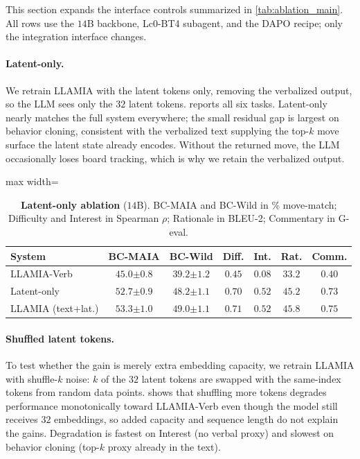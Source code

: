 This section expands the interface controls summarized in \cref{tab:ablation_main}. All rows use the $14$B backbone, Lc0-BT4 subagent, and the DAPO recipe; only the integration interface changes.

\paragraph{Latent-only.} We retrain LLAMIA with the latent tokens only, removing the verbalized output, so the LLM sees only the $32$ latent tokens.  reports all six tasks. Latent-only nearly matches the full system everywhere; the small residual gap is largest on behavior cloning, consistent with the verbalized text supplying the top-$k$ move surface the latent state already encodes. Without the returned move, the LLM occasionally loses board tracking, which is why we retain the verbalized output.

\begin{table}[h]
\centering
\caption{\textbf{Latent-only ablation} ($14$B). BC-MAIA and BC-Wild in \% move-match; Difficulty and Interest in Spearman $\rho$; Rationale in BLEU-2; Commentary in G-eval.}
\label{tab:abl_latent_only}
\begin{adjustbox}{max width=\columnwidth}
\renewcommand{\arraystretch}{1.2}
\small
\begin{tabular}{lcccccc}
\toprule[1.2pt]
\textbf{System} & \textbf{BC-MAIA} & \textbf{BC-Wild} & \textbf{Diff.} & \textbf{Int.} & \textbf{Rat.} & \textbf{Comm.} \\
\midrule
LLAMIA-Verb        & $45.0${\scriptsize$\pm0.8$} & $39.2${\scriptsize$\pm1.2$} & $0.45$ & $0.08$ & $33.2$ & $0.40$ \\
Latent-only        & $52.7${\scriptsize$\pm0.9$} & $48.2${\scriptsize$\pm1.1$} & $0.70$ & $0.52$ & $45.2$ & $0.73$ \\
LLAMIA (text+lat.) & $53.3${\scriptsize$\pm1.0$} & $49.0${\scriptsize$\pm1.1$} & $0.71$ & $0.52$ & $45.8$ & $0.75$ \\
\bottomrule[1.2pt]
\end{tabular}
\end{adjustbox}
\end{table}

\paragraph{Shuffled latent tokens.} To test whether the gain is merely extra embedding capacity, we retrain LLAMIA with shuffle-$k$ noise: $k$ of the $32$ latent tokens are swapped with the same-index tokens from random data points.  shows that shuffling more tokens degrades performance monotonically toward LLAMIA-Verb even though the model still receives $32$ embeddings, so added capacity and sequence length do not explain the gains. Degradation is fastest on Interest (no verbal proxy) and slowest on behavior cloning (top-$k$ proxy already in the text).

